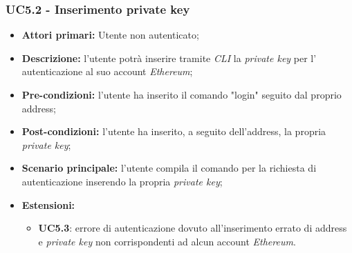 \subsubsection{UC5.2 - Inserimento private key\glo}
\begin{itemize}
	\item \textbf{Attori primari:} Utente non autenticato;
	\item \textbf{Descrizione:} l'utente potrà inserire tramite \textit{CLI\glo} la \textit{private key\glo} per l' autenticazione al suo account \textit{Ethereum\glos}; 
	\item \textbf{Pre-condizioni:} l'utente ha inserito il comando "login" seguito dal proprio address;
	\item \textbf{Post-condizioni:} l'utente ha inserito, a seguito dell'address, la propria \textit{private key\glos};
	\item \textbf{Scenario principale:} l'utente compila il comando per la richiesta di autenticazione inserendo la propria \textit{private key\glos};
	\item \textbf{Estensioni:} 
	\begin{itemize}
		\item \textbf{UC5.3}: errore di autenticazione dovuto all'inserimento errato di address e \textit{private key\glo} non corrispondenti ad alcun account \textit{Ethereum\glos}.
	\end{itemize}
\end{itemize}